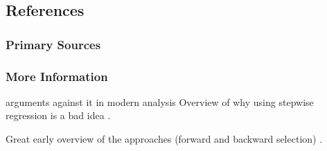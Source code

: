 \subsection{References}

\subsubsection{Primary Sources}



\subsubsection{More Information}

arguments against it in modern analysis
Overview of why using stepwise regression is a bad idea \cite{Whittingham2006}.
\cite{Mundry2009}

Great early overview of the approaches (forward and backward selection) \cite{Hocking1976}.



